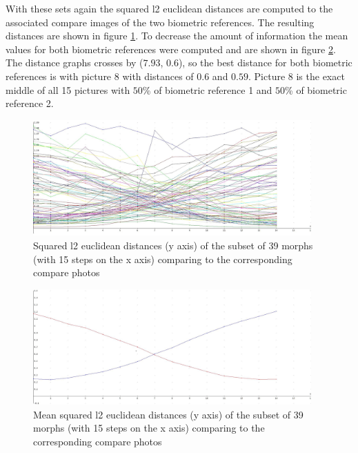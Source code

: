 With these sets again the squared l2 euclidean distances are computed to the associated compare images of the two biometric references. The resulting distances are shown in figure \ref{fig:Result39-all}. To decrease the amount of information the mean values for both biometric references were computed and are shown in figure \ref{fig:Result39-mean}. The distance graphs crosses by ($7.93$, $0.6$), so the best distance for both biometric references is with picture 8 with distances of $0.6$ and $0.59$. Picture 8 is the exact middle of all 15 pictures with $50$\% of biometric reference 1 and $50$\% of biometric reference 2.
\begin{figure}[htbp] 
	\centering
		\includegraphics[width=0.95\textwidth]{Resources/result39-all.jpg}
	\caption{Squared l2 euclidean distances (y axis) of the subset of 39 morphs (with 15 steps on the x axis) comparing to the corresponding compare photos}
	\label{fig:Result39-all}
\end{figure}
\begin{figure}[htbp] 
	\centering
		\includegraphics[width=0.95\textwidth]{Resources/result39-mean.jpg}
	\caption{Mean squared l2 euclidean distances (y axis) of the subset of 39 morphs (with 15 steps on the x axis) comparing to the corresponding compare photos}
	\label{fig:Result39-mean}
\end{figure}

\newpage
